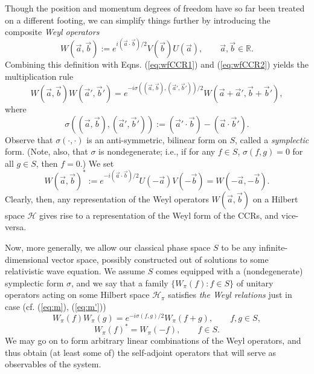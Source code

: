 \documentclass[12pt]{article}
\theoremstyle{remark}
\theoremstyle{definition}
\newcommand{\hil}[1]{\mathcal{#1}}
\begin{document}
 Though the position and momentum degrees of freedom 
 have so far been treated on a different footing, we can simplify things 
 further by introducing the composite \emph{Weyl 
 operators} 
 \begin{equation} 
 W(\vec{a},\vec{b}):=e^{i(\vec{a}\cdot\vec{b})/2}V(\vec{b})U(\vec{a}), 
 \qquad \vec{a},\vec{b}\in \mathbb{R}. \end{equation}
 Combining this definition with Eqns. (\ref{eq:wfCCR1}) and 
 (\ref{eq:wfCCR2})  yields the 
multiplication rule
\begin{equation} \label{eq:m} W(\vec{a},\vec{b})W(\vec{a}',\vec{b}')=
e^{-i\sigma((\vec{a},\vec{b}),(\vec{a}',\vec{b}'))/2}W(\vec{a}+\vec{a}',\vec{b}+
\vec{b}'),\end{equation} 
where 
\begin{equation}
\sigma((\vec{a},\vec{b}),(\vec{a}',\vec{b}')):=(\vec{a}'\cdot
\vec{b})-(\vec{a}\cdot
\vec{b}').  
\end{equation}
Observe that $\sigma(\cdot,\cdot)$ is an anti-symmetric, bilinear 
form on $S$, called a \emph{symplectic} form.  (Note, also, that $\sigma$ 
is nondegenerate; i.e., if for any $f\in S$, $\sigma(f,g)=0$ for all $g\in S$, then 
 $f=0$.) We set 
\begin{equation} \label{eq:m'} 
W(\vec{a},\vec{b})^{*}:=e^{-i(\vec{a}\cdot\vec{b})/2}U(-\vec{a})V(-\vec{b})=
W(-\vec{a},-\vec{b}).\end{equation}  Clearly, then, 
any representation of the Weyl operators $W(\vec{a},\vec{b})$ on a
Hilbert space $\hil{H}$ gives rise to a representation of the Weyl 
form of the CCRs,
and vice-versa.     
 
Now, more generally, we allow our classical phase space $S$ to be any
infinite-dimensional vector space, possibly constructed out of
solutions to some relativistic wave equation. We assume $S$ comes
equipped with a (nondegenerate) symplectic form $\sigma$, and we say
that a family $\{ W_{\pi}(f):f\in S\}$ of unitary operators acting on
some Hilbert space $\hil{H}_{\pi}$ satisfies \emph{the Weyl relations}
just in case (cf. (\ref{eq:m}), (\ref{eq:m'}))
\begin{equation} \label{eq:herro} W_{\pi}(f)W_{\pi}(g)=e^{-i\sigma (f,g)/2}W_{\pi}(f+g) , 
\qquad f,g\in
  S,\end{equation} 
  \begin{equation}
  W_{\pi}(f)^{*}=W_{\pi}(-f), 
\qquad f\in
  S.
  \end{equation}
We may go on to form arbitrary linear combinations of the Weyl
operators, and thus obtain (at least some of) the self-adjoint
operators that will serve as observables of the system.
\end{document}
